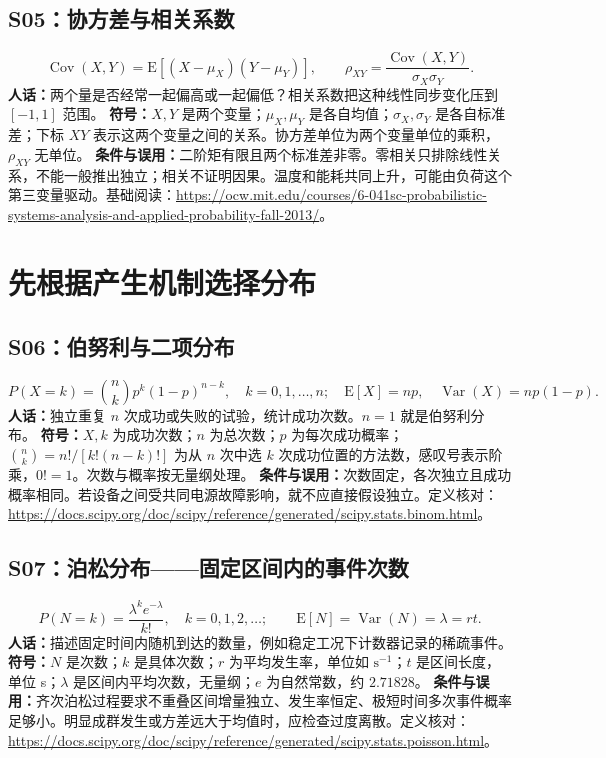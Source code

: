 \documentclass[UTF8,zihao=-4,openany,oneside,fontset=windows]{ctexbook}
\begin{document}
\subsection{S05：协方差与相关系数}
\begin{equation}
 \operatorname{Cov}(X,Y)=\mathrm{E}[(X-\mu_X)(Y-\mu_Y)],\qquad
 \rho_{XY}=\frac{\operatorname{Cov}(X,Y)}{\sigma_X\sigma_Y}.
\end{equation}
\textbf{人话：}两个量是否经常一起偏高或一起偏低？相关系数把这种线性同步变化压到 $[-1,1]$ 范围。
\textbf{符号：}$X,Y$ 是两个变量；$\mu_X,\mu_Y$ 是各自均值；$\sigma_X,\sigma_Y$ 是各自标准差；下标 $XY$ 表示这两个变量之间的关系。协方差单位为两个变量单位的乘积，$\rho_{XY}$ 无单位。
\textbf{条件与误用：}二阶矩有限且两个标准差非零。零相关只排除线性关系，不能一般推出独立；相关不证明因果。温度和能耗共同上升，可能由负荷这个第三变量驱动。基础阅读：\url{https://ocw.mit.edu/courses/6-041sc-probabilistic-systems-analysis-and-applied-probability-fall-2013/}。

\section{先根据产生机制选择分布}
\subsection{S06：伯努利与二项分布}
\begin{equation}
 P(X=k)=\binom{n}{k}p^k(1-p)^{n-k},\quad k=0,1,\ldots,n;
 \quad \mathrm{E}[X]=np,\quad\operatorname{Var}(X)=np(1-p).
\end{equation}
\textbf{人话：}独立重复 $n$ 次成功或失败的试验，统计成功次数。$n=1$ 就是伯努利分布。
\textbf{符号：}$X,k$ 为成功次数；$n$ 为总次数；$p$ 为每次成功概率；$\binom{n}{k}=n!/[k!(n-k)!]$ 为从 $n$ 次中选 $k$ 次成功位置的方法数，感叹号表示阶乘，$0!=1$。次数与概率按无量纲处理。
\textbf{条件与误用：}次数固定，各次独立且成功概率相同。若设备之间受共同电源故障影响，就不应直接假设独立。定义核对：\url{https://docs.scipy.org/doc/scipy/reference/generated/scipy.stats.binom.html}。

\subsection{S07：泊松分布——固定区间内的事件次数}
\begin{equation}
 P(N=k)=\frac{\lambda^k e^{-\lambda}}{k!},\quad k=0,1,2,\ldots;
 \qquad \mathrm{E}[N]=\operatorname{Var}(N)=\lambda=rt.
\end{equation}
\textbf{人话：}描述固定时间内随机到达的数量，例如稳定工况下计数器记录的稀疏事件。
\textbf{符号：}$N$ 是次数；$k$ 是具体次数；$r$ 为平均发生率，单位如 $\mathrm{s}^{-1}$；$t$ 是区间长度，单位 s；$\lambda$ 是区间内平均次数，无量纲；$e$ 为自然常数，约 $2.71828$。
\textbf{条件与误用：}齐次泊松过程要求不重叠区间增量独立、发生率恒定、极短时间多次事件概率足够小。明显成群发生或方差远大于均值时，应检查过度离散。定义核对：\url{https://docs.scipy.org/doc/scipy/reference/generated/scipy.stats.poisson.html}。
\end{document}
